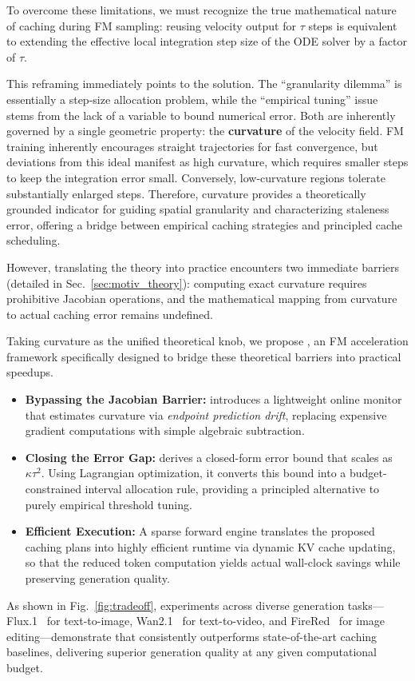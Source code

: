 To overcome these limitations, we must recognize the true mathematical nature of caching during FM sampling: reusing velocity output for $\tau$ steps is equivalent to extending the effective local integration step size of the ODE solver by a factor of $\tau$. 

This reframing immediately points to the solution. The ``granularity dilemma'' is essentially a step-size allocation problem, while the ``empirical tuning'' issue stems from the lack of a variable to bound numerical error. Both are inherently governed by a single geometric property: the \textbf{curvature} of the velocity field. FM training inherently encourages straight trajectories for fast convergence, but deviations from this ideal manifest as high curvature, which requires smaller steps to keep the integration error small. Conversely, low-curvature regions tolerate substantially enlarged steps. Therefore, curvature provides a theoretically grounded indicator for guiding spatial granularity and characterizing staleness error, offering a bridge between empirical caching strategies and principled cache scheduling. 

However, translating the theory into practice encounters two immediate barriers (detailed in Sec.~\ref{sec:motiv_theory}): computing exact curvature requires prohibitive Jacobian operations, and the mathematical mapping from curvature to actual caching error remains undefined. 

Taking curvature as the unified theoretical knob, we propose \cubic, an FM acceleration framework specifically designed to bridge these theoretical barriers into practical speedups. 
\begin{itemize}
    \item \textbf{Bypassing the Jacobian Barrier:} \cubic introduces a lightweight online monitor that estimates curvature via \emph{endpoint prediction drift}, replacing expensive gradient computations with simple algebraic subtraction.
    \item \textbf{Closing the Error Gap:} \cubic derives a closed-form error bound that scales as $\kappa \tau^2$. Using Lagrangian optimization, it converts this bound into a budget-constrained interval allocation rule, providing a principled alternative to purely empirical threshold tuning.
    \item \textbf{Efficient Execution:} A sparse forward engine translates the proposed caching plans into highly efficient runtime via dynamic KV cache updating, so that the reduced token computation yields actual wall-clock savings while preserving generation quality.
\end{itemize}

As shown in Fig.~\ref{fig:tradeoff}, experiments across diverse generation tasks---Flux.1~\cite{flux} for text-to-image, Wan2.1~\cite{wan} for text-to-video, and FireRed~\cite{firered} for image editing---demonstrate that \cubic consistently outperforms state-of-the-art caching baselines, delivering superior generation quality at any given computational budget.